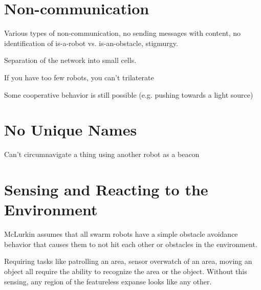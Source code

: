 \documentclass[]{article}
\begin{document}
\section{Non-communication}
Various types of non-communication, no sending messages with content, no identification of is-a-robot vs. is-an-obstacle, stigmurgy.

Separation of the network into small cells. 

If you have too few robots, you can't trilaterate

Some cooperative behavior is still possible (e.g. pushing towards a light source)

\section{No Unique Names}

Can't circumnavigate a thing using another robot as a beacon

\section {Sensing and Reacting to the Environment}

McLurkin assumes that all swarm robots have a simple obstacle avoidance behavior that causes them to not hit each other or obstacles in the environment. %

Requiring tasks like patrolling an area, sensor overwatch of an area, moving an object all require the ability to recognize the area or the object. Without this sensing, any region of the featureless expanse looks like any other. 



\end{document}
